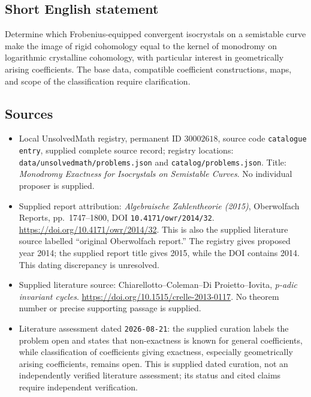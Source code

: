 \documentclass[11pt]{article}
\begin{document}
\subsection{Short English statement}
Determine which Frobenius-equipped convergent isocrystals on a semistable curve make the image of rigid cohomology equal to the kernel of monodromy on logarithmic crystalline cohomology, with particular interest in geometrically arising coefficients. The base data, compatible coefficient constructions, maps, and scope of the classification require clarification.
\subsection{Sources}
\begin{itemize}
\item Local UnsolvedMath registry, permanent ID \(30002618\), source code \texttt{catalogue entry}, supplied complete source record; registry locations: \texttt{data/unsolvedmath/problems.json} and \texttt{catalog/problems.json}. Title: \emph{Monodromy Exactness for Isocrystals on Semistable Curves}. No individual proposer is supplied.
\item Supplied report attribution: \emph{Algebraische Zahlentheorie (2015)}, Oberwolfach Reports, pp.~1747--1800, DOI \texttt{10.4171/owr/2014/32}. \url{https://doi.org/10.4171/owr/2014/32}. This is also the supplied literature source labelled ``original Oberwolfach report.'' The registry gives proposed year 2014; the supplied report title gives 2015, while the DOI contains 2014. This dating discrepancy is unresolved.
\item Supplied literature source: Chiarellotto--Coleman--Di Proietto--Iovita, \emph{p-adic invariant cycles}. \url{https://doi.org/10.1515/crelle-2013-0117}. No theorem number or precise supporting passage is supplied.
\item Literature assessment dated \texttt{2026-08-21}: the supplied curation labels the problem open and states that non-exactness is known for general coefficients, while classification of coefficients giving exactness, especially geometrically arising coefficients, remains open. This is supplied dated curation, not an independently verified literature assessment; its status and cited claims require independent verification.
\end{itemize}
\end{document}
